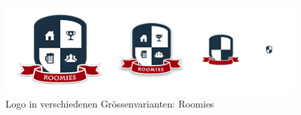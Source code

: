 \begin{figure}[H]
	\centering
	\includegraphics[width=\textwidth]{content/images/logo-variants.png}
	\caption{Logo in verschiedenen Grössenvarianten: Roomies}
\end{figure}